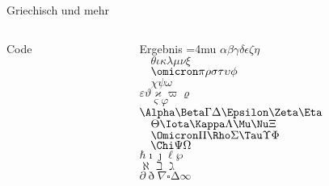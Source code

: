 \begin{frame}[fragile]{Griechisch und mehr}
  \begin{columns}[onlytextwidth,T]
    \begin{column}{0.7\textwidth}
      \begin{block}{Code}
        \begin{lstverbatim}
        \alpha \beta \gamma \delta \epsilon \zeta \eta \theta \iota \kappa \lambda \mu \nu \xi \omicron \pi \rho \sigma \tau \upsilon \phi \chi \psi \omega
        \varepsilon \vartheta \varkappa \varpi \varrho \varsigma \varphi
        \Alpha \Beta \Gamma \Delta \Epsilon \Zeta \Eta \Theta \Iota \Kappa \Lambda \Mu \Nu \Xi \Omicron \Pi \Rho \Sigma \Tau \Upsilon \Phi \Chi \Psi \Omega
        \hbar \imath \jmath \ell \wp
        \aleph \beth \gimel
        \partial \eth \nabla \square \increment \infty
        \end{lstverbatim}
      \end{block}
    \end{column}
    \begin{column}{0.26\textwidth}
      \begin{block}{Ergebnis}
        \Umathordordspacing\textstyle=4mu
        $\alpha \beta \gamma \delta \epsilon \zeta \eta$ \\
        $\quad \theta \iota \kappa \lambda \mu \nu \xi$ \\
        $\quad \omicron \pi \rho \sigma \tau \upsilon \phi$ \\
        $\quad \chi \psi \omega$ \\
        $\varepsilon \vartheta \varkappa \varpi \varrho$ \\
        $\quad \varsigma \varphi$ \\
        $\Alpha \Beta \Gamma \Delta \Epsilon \Zeta \Eta$ \\
        $\quad \Theta \Iota \Kappa \Lambda \Mu \Nu \Xi$ \\
        $\quad \Omicron \Pi \Rho \Sigma \Tau \Upsilon \Phi$ \\
        $\quad \Chi \Psi \Omega$ \\
        $\hbar \imath \jmath \ell \wp$ \\
        $\aleph \beth \gimel$ \\
        $\partial \eth \nabla \square \increment \infty$
      \end{block}
    \end{column}
  \end{columns}
\end{frame}

